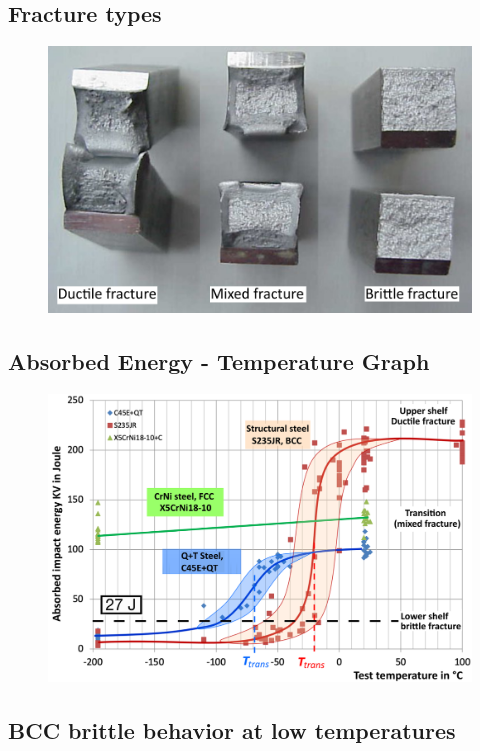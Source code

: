 \documentclass{article}
\begin{document}
\subsection{Fracture types}
\begin{figure}[ht!]
  \centering
  \includegraphics[width=.6\textwidth]{media/fracture_surfaces.png}
\end{figure}

\subsection{Absorbed Energy - Temperature Graph}
\begin{figure}[ht!]
  \centering
  \includegraphics[width=\textwidth]{media/energy_temperature_impact_graph.png}
\end{figure}

\subsection{BCC brittle behavior at low temperatures}
\end{document}
